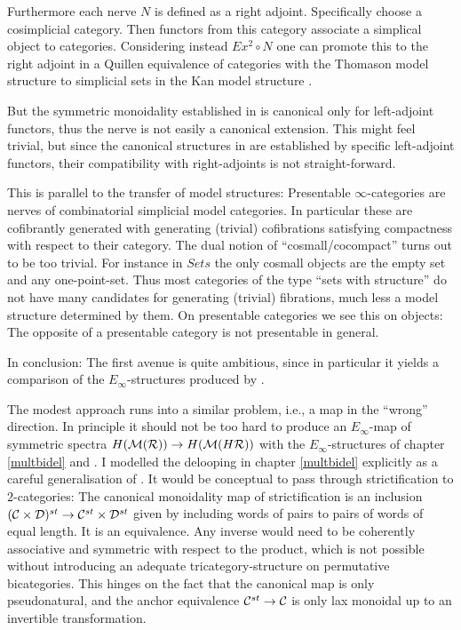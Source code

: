 Furthermore each nerve $N$ is defined as a right adjoint.
Specifically choose a cosimplicial category. Then functors from this
category associate a simplical object to categories. Considering 
instead $Ex^2\circ N$ one can promote this to the right adjoint
in a Quillen equivalence of categories with the Thomason model 
structure to simplicial sets in the Kan model structure \cite{Th3}.

But the symmetric monoidality established in \cite{GGN} is canonical only for 
left-adjoint functors, thus the nerve is not easily a 
canonical extension. This might feel trivial, but since the canonical 
structures in \cite{GGN} are established by specific 
left-adjoint functors, their compatibility with 
right-adjoints is not straight-forward.

This is parallel to the transfer of model structures: Presentable $\infty$-categories 
are nerves of combinatorial simplicial model categories. In particular these 
are cofibrantly generated with generating (trivial) cofibrations satisfying 
compactness with respect to their category. The dual notion of 
``cosmall/cocompact'' turns out to be too trivial. For instance 
in $Sets$ the only cosmall objects are the empty set and any one-point-set. 
Thus most categories of the type ``sets with structure'' do not have many candidates for 
generating (trivial) fibrations, much less a model structure determined by them. 
On presentable categories we see this on objects: The opposite of a presentable
category is not presentable in general.

In conclusion: The first avenue is quite ambitious, since in particular it
yields a comparison of the $E_\infty$-structures produced by \cite{EM,May2009,GGN}.

The modest approach runs into a similar problem, 
i.e., a map in the ``wrong'' direction. In principle it 
should not be too hard to produce an $E_\infty$-map of symmetric 
spectra $H(\mathcal{M}(\mathcal{R}))\rightarrow H(\mathcal{M}(H\mathcal{R}))$ with the $E_\infty$-structures of chapter \ref{multbidel} 
and \cite{EM}. I modelled the delooping in chapter \ref{multbidel} explicitly 
as a careful generalisation of \cite{EM}. It would be 
conceptual to pass through strictification to $2$-categories:
The canonical monoidality map of strictification
is an inclusion $(\mathcal{C}\times\mathcal{D})^{st}\rightarrow \mathcal{C}^{st}\times\mathcal{D}^{st}$ given by
including words of pairs to pairs of words of equal length. It
is an equivalence. Any inverse would need to be 
coherently associative and symmetric with respect to the product, which
is not possible without introducing an adequate 
tricategory-structure on permutative bicategories. 
This hinges on the fact that the canonical map is only pseudonatural, 
and the anchor equivalence $\mathcal{C}^{st}\rightarrow \mathcal{C}$ is only lax 
monoidal up to an invertible transformation. 

